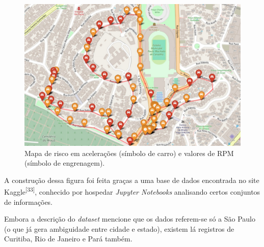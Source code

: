 \begin{figure}[hp]
    \centering
    
    \includegraphics[scale=0.25]{figures/mapa_risco_acc_rpm.jpeg}
    
    \caption{Mapa de risco em acelerações (símbolo de carro) e valores de RPM (símbolo de engrenagem).}
    
    \label{fig:mapa_risco_acc_rpm}
\end{figure}


    
    
    

    
    
    


A construção dessa figura foi feita graças a uma base de dados encontrada no site Kaggle\textsuperscript{[33]}, conhecido por hospedar \textit{Jupyter Notebooks} analisando certos conjuntos de informações.

Embora a descrição do \textit{dataset} mencione que os dados referem-se só a São Paulo (o que já gera ambiguidade entre cidade e estado), existem lá registros de Curitiba, Rio de Janeiro e Pará também.

